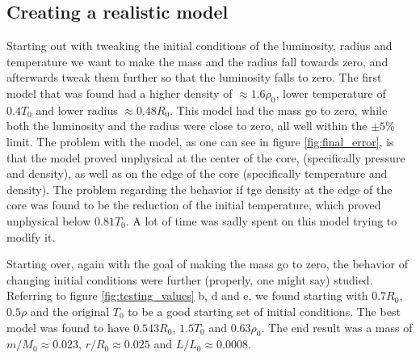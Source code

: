 \documentclass[a4paper,10pt]{article}
\begin{document}




\subsection{Creating a realistic model}
Starting out with tweaking the initial conditions of the luminosity, radius and temperature we want to make the mass and the radius fall towards zero, and afterwards tweak them further so that the luminosity falls to zero. The first model that was found had a higher density of $\approx1.6\rho_0$, lower temperature of $0.4T_0$ and lower radius $\approx 0.48R_0$. This model had the mass go to zero, while both the luminosity and the radius were close to zero, all well within the $\pm 5\%$ limit. The problem with the model, as one can see in figure \ref{fig:final_error}, is that the model proved unphysical at the center of the core, (specifically pressure and density), as well as on the edge of the core (specifically temperature and density). The problem regarding the behavior if tge density at the edge of the core was found to be the reduction of the initial temperature, which proved unphysical below $0.81T_0$. A lot of time was sadly spent on this model trying to modify it. 

Starting over, again with the goal of making the mass go to zero, the behavior of changing initial conditions were further (properly, one might say) studied. Referring to figure \ref{fig:testing_values} b, d and e, we found starting with $0.7R_0$, $0.5\rho$ and the original $T_0$ to be a good starting set of initial conditions. The best model was found to have $0.543R_0$, $1.5T_0$ and $0.63\rho_0$. The end result was a mass of $m/M_0 \approx 0.023$, $r/R_0 \approx 0.025$ and $L/L_0 \approx 0.0008$.


\end{document}
